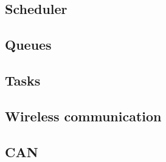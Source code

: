 \subsection{Scheduler}

\newpage

\subsection{Queues}

\newpage
\subsection{Tasks}
\newpage

\subsection{Wireless communication}


\newpage
\subsection{CAN}

\newpage
